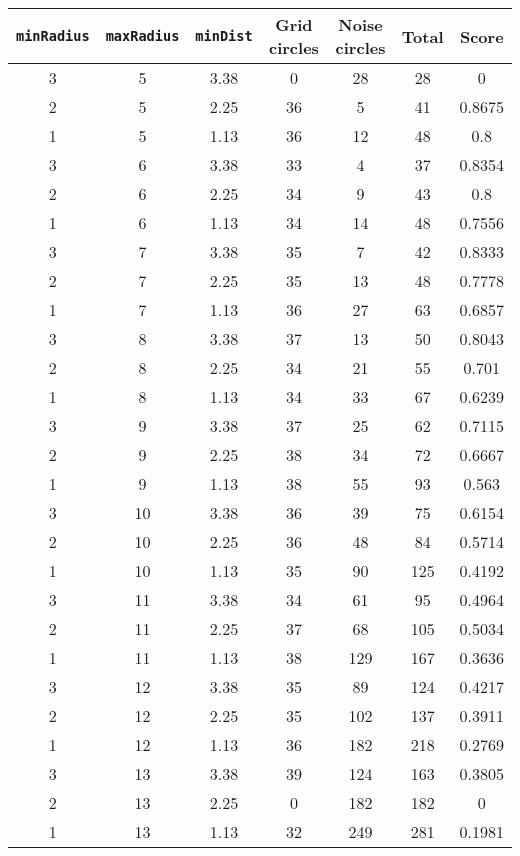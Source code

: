 \documentclass[letterpaper, 12pt]{article}
\begin{document}
\begin{longtable}{|c|c|c|c|c|c|c|}
\hline
\textbf{\texttt{minRadius}} & \textbf{\texttt{maxRadius}} & \textbf{\texttt{minDist}} & \textbf{Grid circles} & \textbf{Noise circles} & \textbf{Total} & \textbf{Score} \\
\hline
3 & 5 & 3.38 & 0 & 28 & 28 & 0 \\
\hline
2 & 5 & 2.25 & 36 & 5 & 41 & 0.8675 \\
\hline
1 & 5 & 1.13 & 36 & 12 & 48 & 0.8 \\
\hline
3 & 6 & 3.38 & 33 & 4 & 37 & 0.8354 \\
\hline
2 & 6 & 2.25 & 34 & 9 & 43 & 0.8 \\
\hline
1 & 6 & 1.13 & 34 & 14 & 48 & 0.7556 \\
\hline
3 & 7 & 3.38 & 35 & 7 & 42 & 0.8333 \\
\hline
2 & 7 & 2.25 & 35 & 13 & 48 & 0.7778 \\
\hline
1 & 7 & 1.13 & 36 & 27 & 63 & 0.6857 \\
\hline
3 & 8 & 3.38 & 37 & 13 & 50 & 0.8043 \\
\hline
2 & 8 & 2.25 & 34 & 21 & 55 & 0.701 \\
\hline
1 & 8 & 1.13 & 34 & 33 & 67 & 0.6239 \\
\hline
3 & 9 & 3.38 & 37 & 25 & 62 & 0.7115 \\
\hline
2 & 9 & 2.25 & 38 & 34 & 72 & 0.6667 \\
\hline
1 & 9 & 1.13 & 38 & 55 & 93 & 0.563 \\
\hline
3 & 10 & 3.38 & 36 & 39 & 75 & 0.6154 \\
\hline
2 & 10 & 2.25 & 36 & 48 & 84 & 0.5714 \\
\hline
1 & 10 & 1.13 & 35 & 90 & 125 & 0.4192 \\
\hline
3 & 11 & 3.38 & 34 & 61 & 95 & 0.4964 \\
\hline
2 & 11 & 2.25 & 37 & 68 & 105 & 0.5034 \\
\hline
1 & 11 & 1.13 & 38 & 129 & 167 & 0.3636 \\
\hline
3 & 12 & 3.38 & 35 & 89 & 124 & 0.4217 \\
\hline
2 & 12 & 2.25 & 35 & 102 & 137 & 0.3911 \\
\hline
1 & 12 & 1.13 & 36 & 182 & 218 & 0.2769 \\
\hline
3 & 13 & 3.38 & 39 & 124 & 163 & 0.3805 \\
\hline
2 & 13 & 2.25 & 0 & 182 & 182 & 0 \\
\hline
1 & 13 & 1.13 & 32 & 249 & 281 & 0.1981 \\

\end{longtable}
\end{document}
